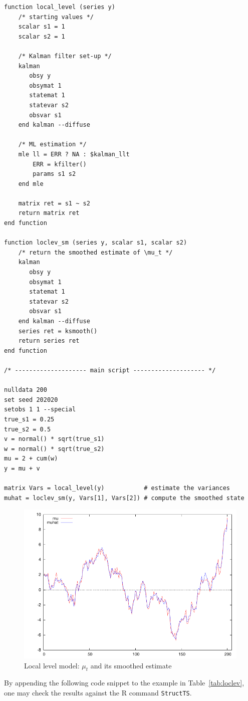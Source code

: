 \documentclass[a4paper]{article}
\begin{document}
\begin{table}[htbp]
  \caption{Local level model}
  \label{tab:loclev}

\begin{small}
\begin{verbatim}
function local_level (series y)
    /* starting values */
    scalar s1 = 1
    scalar s2 = 1

    /* Kalman filter set-up */
    kalman
       obsy y
       obsymat 1
       statemat 1
       statevar s2
       obsvar s1
    end kalman --diffuse

    /* ML estimation */
    mle ll = ERR ? NA : $kalman_llt
        ERR = kfilter()
        params s1 s2
    end mle

    matrix ret = s1 ~ s2
    return matrix ret
end function

function loclev_sm (series y, scalar s1, scalar s2)
    /* return the smoothed estimate of \mu_t */
    kalman
       obsy y
       obsymat 1
       statemat 1
       statevar s2
       obsvar s1
    end kalman --diffuse
    series ret = ksmooth()
    return series ret
end function

/* -------------------- main script -------------------- */

nulldata 200
set seed 202020
setobs 1 1 --special
true_s1 = 0.25
true_s2 = 0.5
v = normal() * sqrt(true_s1)
w = normal() * sqrt(true_s2)
mu = 2 + cum(w)
y = mu + v

matrix Vars = local_level(y)           # estimate the variances
muhat = loclev_sm(y, Vars[1], Vars[2]) # compute the smoothed state
\end{verbatim}
\end{small}
\end{table}

\begin{figure}[htbp]
  \centering
  \includegraphics{../figures/local_level}
  \caption{Local level model: $\mu_t$ and its smoothed estimate}
  \label{fig:loclev}
\end{figure}
By appending the following code snippet to the example in
Table~\ref{tab:loclev}, one may check the results against the
\textsf{R} command \texttt{StructTS}.
\end{document}
